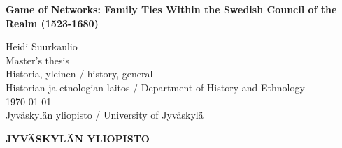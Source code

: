 %
\begin{titlepage}
    \mbox{}\vfill
    \begin{center}
        {\bf\Large Game of Networks: Family Ties Within the Swedish Council of the Realm (1523-1680)}\\
        \vfill
        \begin{flushright}
            Heidi Suurkaulio\\[4pt]
            Master's thesis\\[4pt]%
            Historia, yleinen / history, general\\[4pt]
            Historian ja etnologian laitos / Department of History and Ethnology\\[4pt]
            \today\\[4pt]
            Jyväskylän yliopisto / University of Jyväskylä
        \end{flushright}
    \end{center}
\end{titlepage}

\thispagestyle{empty}

{\bf\Large JYVÄSKYLÄN YLIOPISTO}

